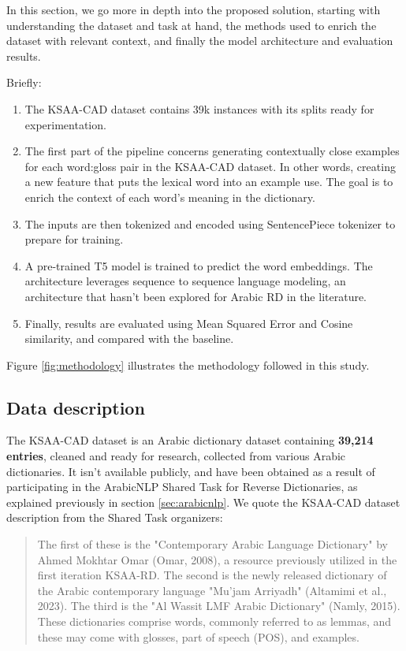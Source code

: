 \documentclass[12pt]{article}
\begin{document}
In this section, we go more in depth into the proposed solution, starting with understanding the dataset and task at hand, the methods used to enrich the dataset with relevant context, and finally the model architecture and evaluation results.

Briefly:
\begin{enumerate}
    \item The KSAA-CAD dataset contains 39k instances with its splits ready for experimentation.
    \item The first part of the pipeline concerns generating contextually close examples for each word:gloss pair in the KSAA-CAD dataset. In other words, creating a new feature that puts the lexical word into an example use. The goal is to enrich the context of each word's meaning in the dictionary.
    \item The inputs are then tokenized and encoded using SentencePiece tokenizer to prepare for training.
    \item A pre-trained T5 model \cite{Linting2021} is trained to predict the word embeddings. The architecture leverages sequence to sequence language modeling, an architecture that hasn’t been explored for Arabic RD in the literature.
    \item Finally, results are evaluated using Mean Squared Error and Cosine similarity, and compared with the baseline.
\end{enumerate}

Figure \ref{fig:methodology} illustrates the methodology followed in this study.

\subsection{Data description}

The KSAA-CAD dataset is an Arabic dictionary dataset containing \textbf{39,214 entries}, cleaned and ready for research, collected from various Arabic dictionaries. It isn't available publicly, and have been obtained as a result of participating in the ArabicNLP Shared Task for Reverse Dictionaries, as explained previously in section \ref{sec:arabicnlp}. We quote the KSAA-CAD dataset description from the Shared Task organizers:

\begin{quote}
    The first of these is the "Contemporary Arabic Language Dictionary" by Ahmed Mokhtar Omar (Omar, 2008), a resource previously utilized in the first iteration KSAA-RD. The second is the newly released dictionary of the Arabic contemporary language "Mu'jam Arriyadh" (Altamimi et al., 2023). The third is the "Al Wassit LMF Arabic Dictionary" (Namly, 2015). These dictionaries comprise words, commonly referred to as lemmas, and these may come with glosses, part of speech (POS), and examples.
\end{quote}
\end{document}
